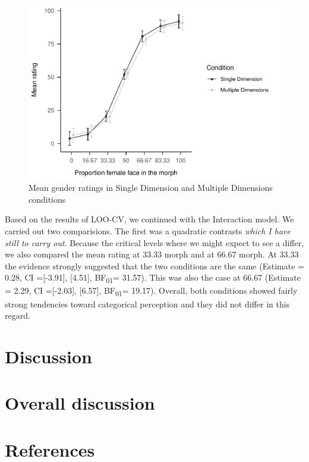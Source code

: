 \documentclass[
  man]{apa7}
\begin{document}
\begin{figure}
\centering
\includegraphics{resp_opts_manus23022_files/figure-latex/exp-two-inf-1.pdf}
\caption{\label{fig:exp-two-inf}Mean gender ratings in Single Dimension and Multiple Dimensions conditions}
\end{figure}

Based on the results of LOO-CV, we continued with the Interaction model. We carried out two comparisions. The first was a quadratic contrasts \emph{which I have still to carry out}. Because the critical levels where we might expect to see a differ, we also compared the mean rating at 33.33 morph and at 66.67 morph. At 33.33 the evidence strongly suggested that the two conditions are the same
(Estimate = 0.28, CI ={[}-3.91{]}, {[}4.51{]}, BF\textsubscript{01}= 31.57). This was also the case at 66.67
(Estimate = 2.29, CI ={[}-2.03{]}, {[}6.57{]}, BF\textsubscript{01}= 19.17). Overall, both conditions showed fairly strong tendencies toward categorical perception and they did not differ in this regard.

\hypertarget{discussion-1}{%
\section{Discussion}\label{discussion-1}}

\hypertarget{overall-discussion}{%
\section{Overall discussion}\label{overall-discussion}}

\newpage

\hypertarget{references}{%
\section{References}\label{references}}
\end{document}
